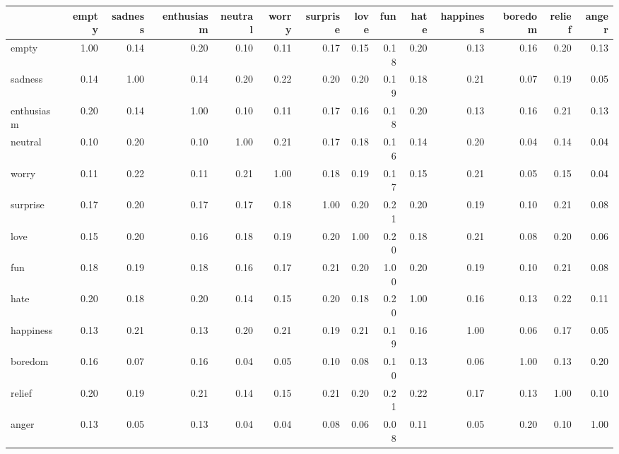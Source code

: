 \begin{tabular}{lrrrrrrrrrrrrr}
\toprule
 & empty & sadness & enthusiasm & neutral & worry & surprise & love & fun & hate & happiness & boredom & relief & anger \\
\midrule
empty & 1.00 & 0.14 & 0.20 & 0.10 & 0.11 & 0.17 & 0.15 & 0.18 & 0.20 & 0.13 & 0.16 & 0.20 & 0.13 \\
sadness & 0.14 & 1.00 & 0.14 & 0.20 & 0.22 & 0.20 & 0.20 & 0.19 & 0.18 & 0.21 & 0.07 & 0.19 & 0.05 \\
enthusiasm & 0.20 & 0.14 & 1.00 & 0.10 & 0.11 & 0.17 & 0.16 & 0.18 & 0.20 & 0.13 & 0.16 & 0.21 & 0.13 \\
neutral & 0.10 & 0.20 & 0.10 & 1.00 & 0.21 & 0.17 & 0.18 & 0.16 & 0.14 & 0.20 & 0.04 & 0.14 & 0.04 \\
worry & 0.11 & 0.22 & 0.11 & 0.21 & 1.00 & 0.18 & 0.19 & 0.17 & 0.15 & 0.21 & 0.05 & 0.15 & 0.04 \\
surprise & 0.17 & 0.20 & 0.17 & 0.17 & 0.18 & 1.00 & 0.20 & 0.21 & 0.20 & 0.19 & 0.10 & 0.21 & 0.08 \\
love & 0.15 & 0.20 & 0.16 & 0.18 & 0.19 & 0.20 & 1.00 & 0.20 & 0.18 & 0.21 & 0.08 & 0.20 & 0.06 \\
fun & 0.18 & 0.19 & 0.18 & 0.16 & 0.17 & 0.21 & 0.20 & 1.00 & 0.20 & 0.19 & 0.10 & 0.21 & 0.08 \\
hate & 0.20 & 0.18 & 0.20 & 0.14 & 0.15 & 0.20 & 0.18 & 0.20 & 1.00 & 0.16 & 0.13 & 0.22 & 0.11 \\
happiness & 0.13 & 0.21 & 0.13 & 0.20 & 0.21 & 0.19 & 0.21 & 0.19 & 0.16 & 1.00 & 0.06 & 0.17 & 0.05 \\
boredom & 0.16 & 0.07 & 0.16 & 0.04 & 0.05 & 0.10 & 0.08 & 0.10 & 0.13 & 0.06 & 1.00 & 0.13 & 0.20 \\
relief & 0.20 & 0.19 & 0.21 & 0.14 & 0.15 & 0.21 & 0.20 & 0.21 & 0.22 & 0.17 & 0.13 & 1.00 & 0.10 \\
anger & 0.13 & 0.05 & 0.13 & 0.04 & 0.04 & 0.08 & 0.06 & 0.08 & 0.11 & 0.05 & 0.20 & 0.10 & 1.00 \\
\bottomrule
\end{tabular}
